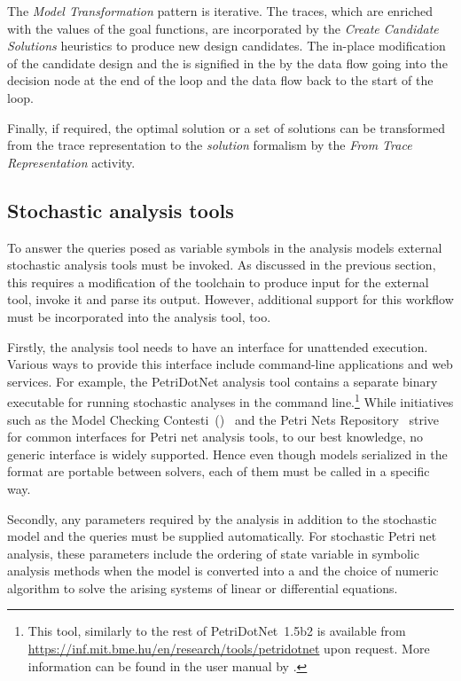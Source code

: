The \emph{Model Transformation}  pattern is iterative. The traces, which are enriched with the values of the goal functions, are incorporated by the \emph{Create Candidate Solutions} heuristics to produce new design candidates. The in-place modification of the candidate design and the  is signified in the  by the data flow going into the decision node at the end of the loop and the data flow back to the start of the loop.

Finally, if required, the optimal solution or a set of solutions can be transformed from the trace representation to the \emph{solution} formalism by the \emph{From Trace Representation} activity.

\subsection{Stochastic analysis tools}
\label{ssec:apply:integration-solver}

To answer the queries posed as variable symbols in the  analysis models external stochastic analysis tools must be invoked. As discussed in the previous section, this requires a modification of the  toolchain to produce input for the external tool, invoke it and parse its output. However, additional support for this workflow must be incorporated into the analysis tool, too.

Firstly, the analysis tool needs to have an interface for unattended execution. Various ways to provide this interface include command-line applications and web services. For example, the PetriDotNet analysis tool contains a separate binary executable for running stochastic analyses in the command line.\footnote{This tool, similarly to the rest of PetriDotNet~1.5b2 is available from \url{https://inf.mit.bme.hu/en/research/tools/petridotnet} upon request. More information can be found in the user manual by \citet{Voros17pdnmanual}.} While initiatives such as the Model Checking Contesti~()~\citep{Kordon17mcc} and the Petri Nets Repository~\citep{Hillah17repository} strive for common interfaces for Petri net analysis tools, to our best knowledge, no generic interface is widely supported. Hence even though models serialized in the  format are portable between solvers, each of them must be called in a specific way.

Secondly, any parameters required by the analysis in addition to the stochastic model and the queries must be supplied automatically. For stochastic Petri net analysis, these parameters include the ordering of state variable in symbolic analysis methods when the model is converted into a  and the choice of numeric algorithm to solve the arising systems of linear or differential equations.

